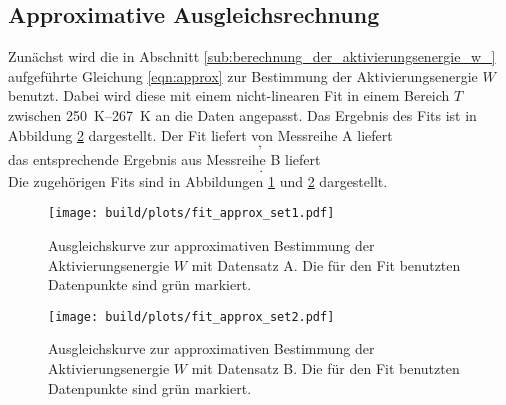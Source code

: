 \subsection{Approximative Ausgleichsrechnung}
\label{subsec:approx}
Zunächst wird die in Abschnitt \ref{sub:berechnung_der_aktivierungsenergie_w_}
aufgeführte Gleichung \ref{eqn:approx} zur Bestimmung der Aktivierungsenergie
$W$ benutzt. Dabei wird diese mit einem nicht-linearen Fit in einem Bereich
$T$ zwischen \SIrange{250}{267}{\kelvin} an die Daten angepasst.
Das Ergebnis des Fits ist in Abbildung \ref{fig:fit_approx_set2} dargestellt.
Der Fit liefert von Messreihe A liefert
\begin{equation*}
    \,,
\end{equation*}
das entsprechende Ergebnis aus Messreihe B liefert
\begin{equation*}
    \,.
\end{equation*}
Die zugehörigen Fits sind in Abbildungen \ref{fig:fit_approx_set1}
und \ref{fig:fit_approx_set2} dargestellt.
\begin{figure}
    \centering
    \texttt{[image: build/plots/fit\_approx\_set1.pdf]}
    \caption{Ausgleichskurve zur approximativen Bestimmung der
    Aktivierungsenergie $W$ mit Datensatz A. Die für den Fit benutzten Datenpunkte
    sind grün markiert.}
    \label{fig:fit_approx_set1}
\end{figure}
\begin{figure}
    \centering
    \texttt{[image: build/plots/fit\_approx\_set2.pdf]}
    \caption{Ausgleichskurve zur approximativen Bestimmung der
    Aktivierungsenergie $W$ mit Datensatz B. Die für den Fit benutzten Datenpunkte
    sind grün markiert.}
    \label{fig:fit_approx_set2}
\end{figure}

